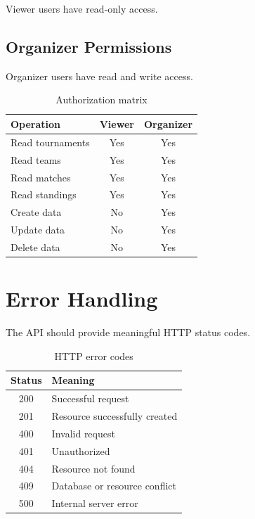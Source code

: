 \documentclass[12pt,a4paper]{article}
\begin{document}
Viewer users have read-only access.

\subsection{Organizer Permissions}

Organizer users have read and write access.

\begin{table}[H]
\centering
\begin{tabular}{lcc}
\toprule
\textbf{Operation} & \textbf{Viewer} & \textbf{Organizer}\\
\midrule
Read tournaments & Yes & Yes\\
Read teams & Yes & Yes\\
Read matches & Yes & Yes\\
Read standings & Yes & Yes\\
Create data & No & Yes\\
Update data & No & Yes\\
Delete data & No & Yes\\
\bottomrule
\end{tabular}
\caption{Authorization matrix}
\end{table}


\section{Error Handling}

The API should provide meaningful HTTP status codes.

\begin{table}[H]
\centering
\begin{tabular}{cl}
\toprule
\textbf{Status} & \textbf{Meaning}\\
\midrule
200 & Successful request\\
201 & Resource successfully created\\
400 & Invalid request\\
401 & Unauthorized\\
404 & Resource not found\\
409 & Database or resource conflict\\
500 & Internal server error\\
\bottomrule
\end{tabular}
\caption{HTTP error codes}
\end{table}
\end{document}
